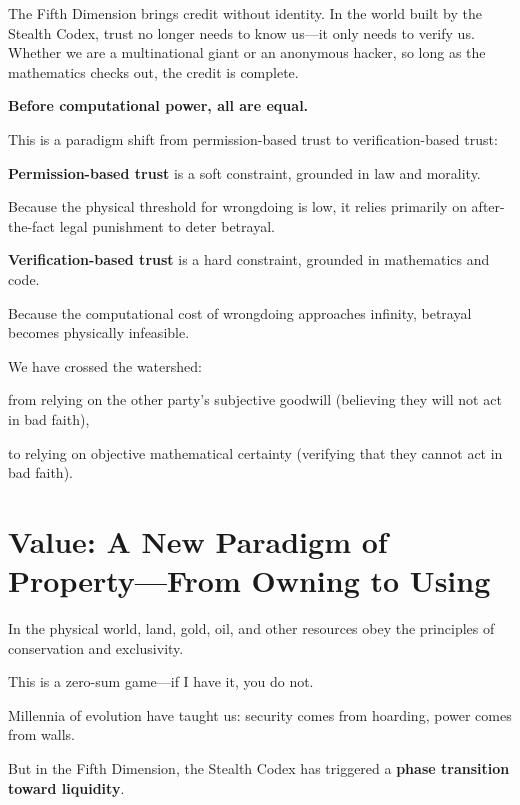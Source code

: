 \vspace{1em}

The Fifth Dimension brings credit without identity.
In the world built by the Stealth Codex, trust no longer needs to know us---it only needs to verify us.
Whether we are a multinational giant or an anonymous hacker, so long as the mathematics checks out, the credit is complete.

\begin{importantbox}
    \textbf{Before computational power, all are equal.}
\end{importantbox}

This is a paradigm shift from permission-based trust to verification-based trust:

\textbf{Permission-based trust} is a soft constraint, grounded in law and morality.

Because the physical threshold for wrongdoing is low, it relies primarily on after-the-fact legal punishment to deter betrayal.

\textbf{Verification-based trust} is a hard constraint, grounded in mathematics and code.

Because the computational cost of wrongdoing approaches infinity, betrayal becomes physically infeasible.

\vspace{1em}

We have crossed the watershed:

from relying on the other party's subjective goodwill (believing they will not act in bad faith),

to relying on objective mathematical certainty (verifying that they cannot act in bad faith).


\newpage

\section{Value: A New Paradigm of Property---From Owning to Using}

In the physical world, land, gold, oil, and other resources obey the principles of conservation and exclusivity.

This is a zero-sum game---if I have it, you do not.

Millennia of evolution have taught us: security comes from hoarding, power comes from walls.

\vspace{1em}

But in the Fifth Dimension, the Stealth Codex has triggered a \textbf{phase transition toward liquidity}.

